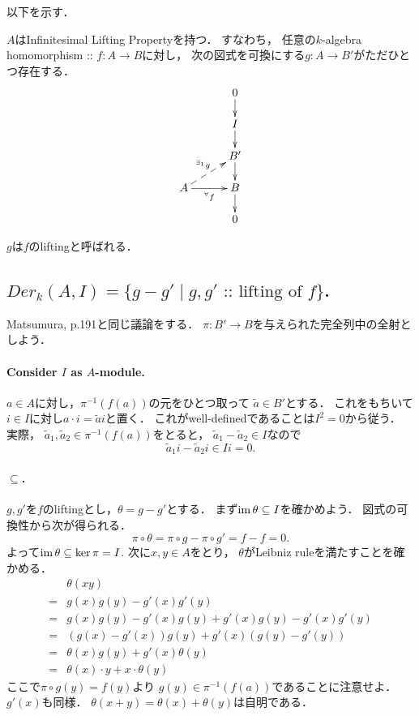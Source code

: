 \documentclass[a4paper]{jsarticle}
\begin{document}
    以下を示す．
    \begin{Thm}
        $A$はInfinitesimal Lifting Propertyを持つ．
        すなわち，
        任意の$k$-algebra homomorphism :: $f: A \to B$に対し，
        次の図式を可換にする$g: A \to B'$がただひとつ存在する．
        \[
        \xymatrix@R=15pt@C=30pt
        {
            {} & 0 \ar[d]\\
            {} & I \ar[d]\\
            {} & B'\ar[d]\\
            A \ar[r]_-{{}^{\forall} f} \ar@{-->}[ru]^{{}^{\exists_1} g}& B \ar[d]\\
            {} & 0 \\
        }
        \]
    \end{Thm}
    $g$は$f$のliftingと呼ばれる．
    
    \subsection{$Der_k(A,I)=\{ g-g' \mid g,g' \text{ :: lifting of }f\}$.}
    Matsumura, p.191と同じ議論をする．
    $\pi: B' \to B$を与えられた完全列中の全射としよう．

    \paragraph{Consider $I$ as $A$-module.}
    $a \in A$に対し，$\pi^{-1}(f(a))$の元をひとつ取って
    $\tilde{a} \in B'$とする．
    これをもちいて$i \in I$に対し$a \cdot i=\tilde{a}i$と置く．
    これがwell-definedであることは$I^2=0$から従う．
    実際，
    $\tilde{a}_1, \tilde{a}_2 \in \pi^{-1}(f(a))$をとると，
    $\tilde{a}_1-\tilde{a}_2 \in I$なので
    \[ \tilde{a}_1 i-\tilde{a}_2 i \in I i=0. \]

    \paragraph{$\subseteq$.}
    $g, g'$を$f$のliftingとし，$\theta=g-g'$とする．
    まず$\operatorname{im} \theta \subseteq I$を確かめよう．
    図式の可換性から次が得られる．
    \[ \pi \circ \theta=\pi \circ g- \pi \circ g'=f-f=0. \]
    よって$\operatorname{im} \theta \subseteq \ker \pi=I$.
    次に$x, y \in A$をとり，
    $\theta$がLeibniz ruleを満たすことを確かめる．
    \begin{align*}
        {}& \theta(xy) \\
        =&  g(x)g(y)-g'(x)g'(y) \\
        =&  g(x)g(y)-g'(x)g(y)+g'(x)g(y)-g'(x)g'(y) \\
        =&  (g(x)-g'(x)) g(y)+g'(x) (g(y)-g'(y)) \\
        =&  \theta(x) g(y)+g'(x) \theta(y) \\
        =&  \theta(x) \cdot y+x \cdot \theta(y)
    \end{align*}
    ここで$\pi \circ g(y)=f(y)$より
    $g(y) \in \pi^{-1}(f(a))$であることに注意せよ．
    $g'(x)$も同様．
    $\theta(x+y)=\theta(x)+\theta(y)$は自明である．
\end{document}
